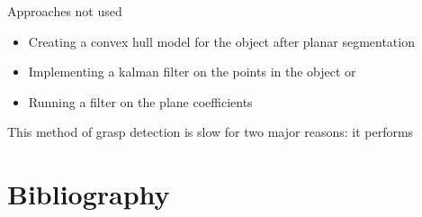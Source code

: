 \documentclass[10pt]{article}
\begin{document}
Approaches not used
\begin{itemize}
\item Creating a convex hull model for the object after planar segmentation
\item Implementing a kalman filter on the points in the object or
\item Running a filter on the plane coefficients
\end{itemize}

\par This method of grasp detection is slow for two major reasons: it performs 

\section{Bibliography}
 

\end{document}
